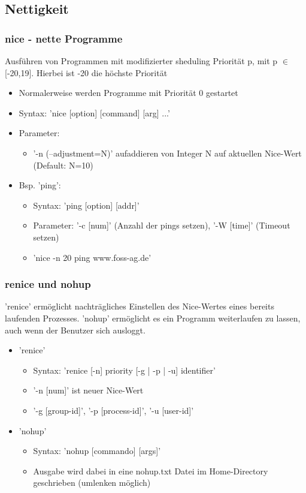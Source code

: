 \documentclass[12pt,utf8, handout]{beamer}
\begin{document}
\subsection{Nettigkeit}
\begin{frame}
\frametitle{nice - nette Programme}
Ausführen von Programmen mit modifizierter sheduling Priorität p, mit p $\in$ [-20,19]. Hierbei ist -20 die höchste Priorität
\begin{itemize}[<+->]
	\item Normalerweise werden Programme mit Priorität 0 gestartet
	\item Syntax: 'nice [option] [command] [arg] ...'
	\item Parameter:
	\begin{itemize}
		\item '-n (--adjustment=N)' aufaddieren von Integer N auf aktuellen Nice-Wert (Default: N=10)
	\end{itemize}
	\item Bsp. 'ping':
	\begin{itemize}[<+->]
		\item Syntax: 'ping [option] [addr]'
		\item Parameter: '-c [num]' (Anzahl der pings setzen), '-W [time]' (Timeout setzen)
		\item 'nice -n 20 ping www.foss-ag.de'
	\end{itemize}
\end{itemize}
\end{frame}

\begin{frame}
\frametitle{renice und nohup}
'renice' ermöglicht nachträgliches Einstellen des Nice-Wertes eines bereits laufenden Prozesses.
'nohup' ermöglicht es ein Programm weiterlaufen zu lassen, auch wenn der Benutzer sich ausloggt.
\begin{itemize}
	\item 'renice'
	\begin{itemize}[<+->]
		\item Syntax: 'renice [-n] priority [-g | -p | -u] identifier'
		\item '-n [num]' ist neuer Nice-Wert
		\item '-g [group-id]', '-p [process-id]', '-u [user-id]'
	\end{itemize}
	\item 'nohup'
	\begin{itemize}
		\item Syntax: 'nohup [commando] [args]'
		\item Ausgabe wird dabei in eine nohup.txt Datei im Home-Directory geschrieben (umlenken möglich)
	\end{itemize}
\end{itemize}
\end{frame}
\end{document}
